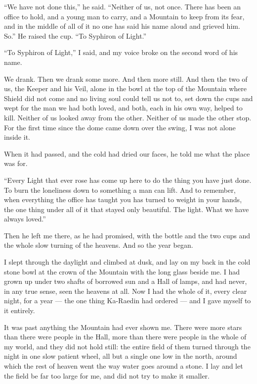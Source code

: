 ``We have not done this,'' he said. ``Neither of us, not once. There has been an office to hold, and a young man to carry, and a Mountain to keep from its fear, and in the middle of all of it no one has said his name aloud and grieved him. So.'' He raised the cup. ``To Syphiron of Light.''\par

``To Syphiron of Light,'' I said, and my voice broke on the second word of his name.\par

We drank. Then we drank some more. And then more still. And then the two of us, the Keeper and his Veil, alone in the bowl at the top of the Mountain where Shield did not come and no living soul could tell us not to, set down the cups and wept for the man we had both loved, and both, each in his own way, helped to kill. Neither of us looked away from the other. Neither of us made the other stop. For the first time since the dome came down over the swing, I was not alone inside it.\par

When it had passed, and the cold had dried our faces, he told me what the place was for.\par

``Every Light that ever rose has come up here to do the thing you have just done. To burn the loneliness down to something a man can lift. And to remember, when everything the office has taught you has turned to weight in your hands, the one thing under all of it that stayed only beautiful. The light. What we have always loved.''\par

Then he left me there, as he had promised, with the bottle and the two cups and the whole slow turning of the heavens. And so the year began.\par

I slept through the daylight and climbed at dusk, and lay on my back in the cold stone bowl at the crown of the Mountain with the long glass beside me. I had grown up under two shafts of borrowed sun and a Hall of lamps, and had never, in any true sense, seen the heavens at all. Now I had the whole of it, every clear night, for a year --- the one thing Ka-Raedin had ordered --- and I gave myself to it entirely.\par

It was past anything the Mountain had ever shown me. There were more stars than there were people in the Hall, more than there were people in the whole of my world, and they did not hold still: the entire field of them turned through the night in one slow patient wheel, all but a single one low in the north, around which the rest of heaven went the way water goes around a stone. I lay and let the field be far too large for me, and did not try to make it smaller.\par

